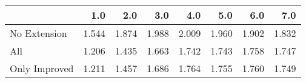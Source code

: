 \begin{tabular}{lrrrrrrr}
\toprule
{} &   1.0 &   2.0 &   3.0 &   4.0 &   5.0 &   6.0 &   7.0 \\
\midrule
No Extension  & 1.544 & 1.874 & 1.988 & 2.009 & 1.960 & 1.902 & 1.832 \\
All           & 1.206 & 1.435 & 1.663 & 1.742 & 1.743 & 1.758 & 1.747 \\
Only Improved & 1.211 & 1.457 & 1.686 & 1.764 & 1.755 & 1.760 & 1.749 \\
\bottomrule
\end{tabular}
